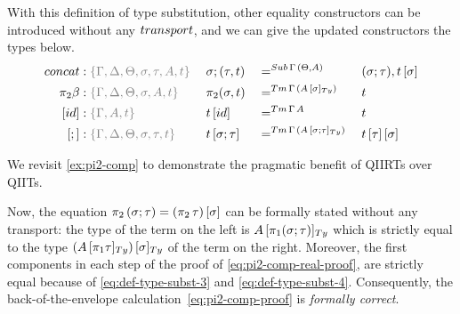 \documentclass[a4paper,UKenglish,numberwithinsect,cleveref,thm-restate]{lipics-v2021}
\begin{document}
With this definition of type substitution, other equality constructors can be introduced without any $\transp$, and we can give the updated constructors the types below.
\begin{alignat*}{5}
  \mathsf{concat} & : \implicit{\Gamma, \Delta, \Theta, \sigma, \tau, A, t}\; &&\sigma ; (\tau , t) {} && =^{\Sub\,\Gamma\,(\Theta, A)} {} &&  (\sigma ; \tau), \sub{t}{\sigma} \\
  \pi_2\beta      & : \implicit{\Gamma, \Delta, \Theta, \sigma, A, t} && \pi_2(\sigma , t)          {} && =^{\Tm\,\Gamma\, (\subTy{A}{\sigma})} {} &&  t \\
  [\idS]         & : \implicit{\Gamma, A, t} && {\sub{t}{\idS}}          && =^{\Tm\,\Gamma\,A}      {} && t \\
  [;]            & : \implicit{\Gamma, \Delta, \Theta, \sigma, \tau, t}  && {\sub{t}{\sigma ; \tau}} && =^{\Tm\,\Gamma\,(\subTy{A}{\sigma ; \tau})} {} && {\sub{\sub{t}{\tau}}{\sigma}}
\end{alignat*}

We revisit \cref{ex:pi2-comp} to demonstrate the pragmatic benefit of QIIRTs over QIITs.
\begin{example} \label{ex:pi-comp-qiirt}
  Now, the equation $\pi_2\,(\sigma; \tau) = {(\pi_2\,\tau)}\,[\sigma]$ can be formally stated without any transport: the type of the term on the left is $\subTy{A}{\pi_1(\sigma;\tau)}$ which is strictly equal to the type $\subTy{(\subTy{A}{\pi_1\tau})}{\sigma}$ of the term on the right.
  Moreover, the first components in each step of the proof of \eqref{eq:pi2-comp-real-proof}, are strictly equal because of \eqref{eq:def-type-subst-3} and \eqref{eq:def-type-subst-4}.
  Consequently, the back-of-the-envelope calculation~\eqref{eq:pi2-comp-proof} is \emph{formally correct}.
\end{example}
\end{document}
